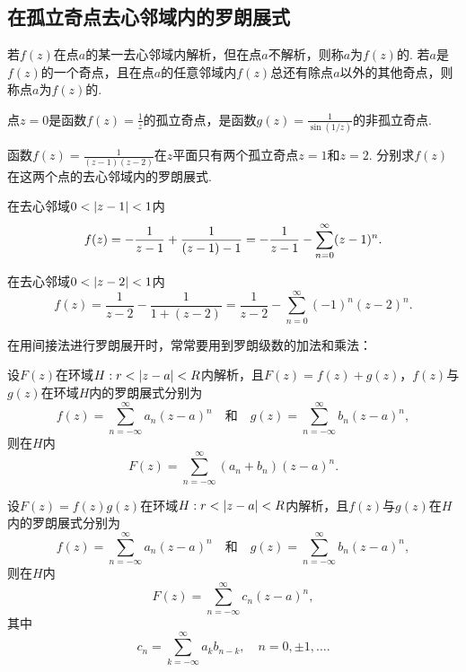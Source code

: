 \subsection{在孤立奇点去心邻域内的罗朗展式}
\begin{definition}
若\(f(z)\)在点\(a\)的某一去心邻域内解析，但在点\(a\)不解析，则称\(a\)为\(f(z)\)的.
若\(a\)是\(f(z)\)的一个奇点，且在点\(a\)的任意邻域内\(f(z)\)总还有除点\(a\)以外的其他奇点，则称点\(a\)为\(f(z)\)的.
\end{definition}

\begin{example}
点\(z=0\)是函数\(f(z) = \frac{1}{z}\)的孤立奇点，是函数\(g(z) = \frac{1}{\sin(1/z)}\)的非孤立奇点.
\end{example}

\begin{example}
函数\(f(z) = \frac{1}{(z-1)(z-2)}\)在\(z\)平面只有两个孤立奇点\(z=1\)和\(z=2\).
分别求\(f(z)\)在这两个点的去心邻域内的罗朗展式.
\begin{solution}
在去心邻域\(0<\abs{z-1}<1\)内\[
f(z) = -\frac{1}{z-1} + \frac{1}{(z-1)-1} \\
= -\frac{1}{z-1} - \sum_{n=0}^\infty (z-1)^n.
\]

在去心邻域\(0<\abs{z-2}<1\)内\[
f(z) = \frac{1}{z-2} - \frac{1}{1+(z-2)}
= \frac{1}{z-2} - \sum_{n=0}^\infty (-1)^n (z-2)^n.
\]
\end{solution}
\end{example}

在用间接法进行罗朗展开时，常常要用到罗朗级数的加法和乘法：
\begin{theorem}[罗朗级数的加法]
设\(F(z)\)在环域\(H: r < \abs{z-a} < R\)内解析，且\(F(z) = f(z) + g(z)\)，\(f(z)\)与\(g(z)\)在环域\(H\)内的罗朗展式分别为\[
f(z) = \sum_{n=-\infty}^\infty a_n (z-a)^n
\quad\text{和}\quad
g(z) = \sum_{n=-\infty}^\infty b_n (z-a)^n,
\]则在\(H\)内\[
F(z) = \sum_{n=-\infty}^\infty (a_n+b_n) (z-a)^n.
\]
\end{theorem}

\begin{theorem}[罗朗级数的乘法]
设\(F(z) = f(z) g(z)\)在环域\(H: r < \abs{z-a} < R\)内解析，且\(f(z)\)与\(g(z)\)在\(H\)内的罗朗展式分别为\[
f(z) = \sum_{n=-\infty}^\infty a_n (z-a)^n
\quad\text{和}\quad
g(z) = \sum_{n=-\infty}^\infty b_n (z-a)^n,
\]则在\(H\)内\[
F(z) = \sum_{n=-\infty}^\infty c_n (z-a)^n,
\]其中\[
c_n = \sum_{k=-\infty}^\infty a_k b_{n-k},
\quad n=0,\pm1,\dotsc.
\]
\end{theorem}

